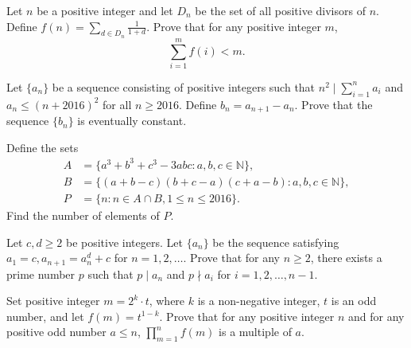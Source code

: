\documentclass[problems.tex]{subfile}
\begin{document}
	
	
	
	
	\begin{problem}
		Let $n$ be a positive integer and let $D_n$ be the set of all positive divisors of $n$. Define $f(n)=\sum\limits_{d\in D_n}{\frac{1}{1+d}}$.
		Prove that for any positive integer $m$, $$\sum_{i=1}^{m}{f(i)} <m.$$
	\end{problem}
	
	
	
	\begin{problem}
		Let $\{ a_n\}$ be a sequence consisting of positive integers such that $n^2 \mid \sum_{i=1}^{n}{a_i}$ and $a_n\leq (n+2016)^2$ for all $n\geq 2016$.
		Define $b_n=a_{n+1}-a_n$. Prove that the sequence $\{ b_n\}$ is eventually constant. %
	\end{problem}
	
	
	
	\begin{problem}
		Define the sets 
		\begin{align*}
			A &=\{a^3+b^3+c^3-3abc:a,b,c\in\mathbb{N}\}, \\
			B &=\{(a+b-c)(b+c-a)(c+a-b):a,b,c\in\mathbb{N}\},\\
			P &=\{n:n\in A\cap B,1\le n\le 2016\}.
		\end{align*}
		Find the number of elements of $P$. %
	\end{problem}
	
	
	
	\begin{problem}
		Let $c,d \geq 2$ be positive integers. Let $\{a_n\}$ be the sequence satisfying $a_1 = c, a_{n+1} = a_n^d + c$ for $n = 1,2,\dots$.
		Prove that for any $n \geq 2$, there exists a prime number $p$ such that $p\mid a_n$ and $p \nmid a_i$ for $i = 1,2,\dots, n-1$. %
	\end{problem}
	
	
	
	\begin{problem}
		Set positive integer $m=2^k\cdot t$, where $k$ is a non-negative integer, $t$ is an odd number, and let $f(m)=t^{1-k}$. Prove that for any positive integer $n$ and for any positive odd number $a\le n$, $\prod_{m=1}^n f(m)$ is a multiple of $a$. %
	\end{problem}
	
\end{document}
